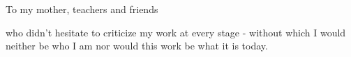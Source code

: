 %

{\Large To my mother, teachers and friends}

who didn't hesitate to criticize my work at every stage - without which I
would neither be who I am nor would this work be what it is today.
